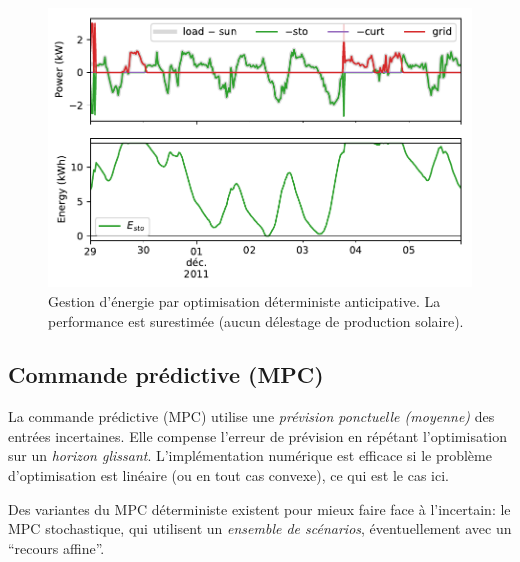 \documentclass[a4paper,10pt,twocolumn]{article}
\begin{document}

\begin{figure}[!ht]
        \begin{center}
                \includegraphics[width=1\columnwidth]{figures/julia_anticipative.pdf}
        \end{center}

        \caption{Gestion d'énergie par optimisation déterministe anticipative. La performance est surestimée
        (aucun délestage de production solaire).
        }
        \label{fig:anticip}
\end{figure}

\subsection{Commande prédictive (MPC)}
La commande prédictive (MPC) utilise une \emph{prévision ponctuelle (moyenne)} des entrées incertaines.
Elle compense l'erreur de prévision en répétant l'optimisation sur un \emph{horizon glissant}.
L'implémentation numérique est efficace si le problème d'optimisation est linéaire (ou en tout cas convexe),
ce qui est le cas ici.

Des variantes du MPC déterministe existent pour mieux faire face à l'incertain: le MPC stochastique,
qui utilisent un \emph{ensemble de scénarios}, éventuellement avec un ``recours affine''.


\end{document}
